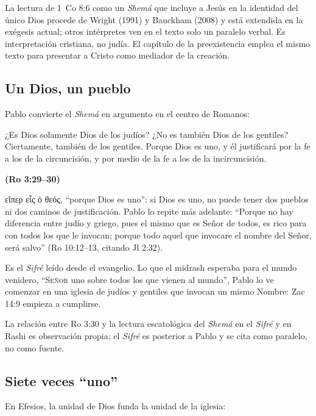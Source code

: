 \documentclass[11pt,letterpaper]{article}
\newcommand{\grc}[1]{\foreignlanguage{ancientgreek}{#1}}
\newcommand{\SENOR}{\textsc{Señor}}
\newcommand{\fuente}[1]{\par\hfill{\upshape\bfseries\small\textcolor{azul}{#1}}}
\begin{document}
\begin{nota}[Precisión]
La lectura de 1~Co 8:6 como un \emph{Shemá} que incluye a Jesús en la identidad del único Dios procede de Wright (1991) y Bauckham (2008) y está extendida en la exégesis actual; otros intérpretes ven en el texto solo un paralelo verbal. Es interpretación cristiana, no judía. El capítulo de la preexistencia emplea el mismo texto para presentar a Cristo como mediador de la creación.
\end{nota}

\subsection{Un Dios, un pueblo}
Pablo convierte el \emph{Shemá} en argumento en el centro de Romanos:

\begin{cita}¿Es Dios solamente Dios de los judíos? ¿No es también Dios de los gentiles? Ciertamente, también de los gentiles. Porque Dios es uno, y él justificará por la fe a los de la circuncisión, y por medio de la fe a los de la incircuncisión.\fuente{(Ro 3:29--30)}\end{cita}

\grc{εἴπερ εἷς ὁ θεός}, ``porque Dios es uno'': si Dios es uno, no puede tener dos pueblos ni dos caminos de justificación. Pablo lo repite más adelante: ``Porque no hay diferencia entre judío y griego, pues el mismo que es Señor de todos, es rico para con todos los que le invocan; porque todo aquel que invocare el nombre del Señor, será salvo'' (Ro 10:12--13, citando Jl 2:32).

Es el \emph{Sifré} leído desde el evangelio. Lo que el midrash esperaba para el mundo venidero, ``\SENOR{} uno sobre todos los que vienen al mundo'', Pablo lo ve comenzar en una iglesia de judíos y gentiles que invocan un mismo Nombre: Zac 14:9 empieza a cumplirse.

\begin{nota}[Precisión]
La relación entre Ro 3:30 y la lectura escatológica del \emph{Shemá} en el \emph{Sifré} y en Rashi es observación propia; el \emph{Sifré} es posterior a Pablo y se cita como paralelo, no como fuente.
\end{nota}

\subsection{Siete veces ``uno''}
En Efesios, la unidad de Dios funda la unidad de la iglesia:
\end{document}
